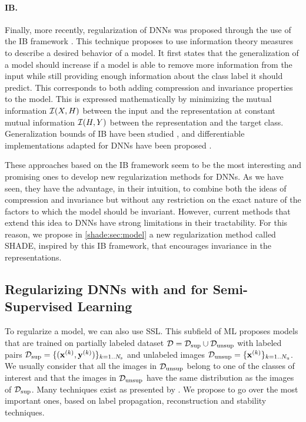 \paragraph{\acf{IB}.} Finally, more recently, regularization of \acp{DNN} was proposed through the use of the \acf{IB} framework \citep{IB}. This technique proposes to use information theory measures to describe a desired behavior of a model. It first states that the generalization of a model should increase if a model is able to remove more information from the input while still providing enough information about the class label it should predict. This corresponds to both adding compression and invariance properties to the model. This is expressed mathematically by minimizing the mutual information $\mathcal{I}(X, H)$ between the input and the representation at constant mutual information $\mathcal{I}(H, Y)$ between the representation and the target class. Generalization bounds of \ac{IB} have been studied \citep{IBbound}, and differentiable implementations adapted for \acp{DNN} have been proposed \citep{Achille2016,IBvariational,Pereyra2017}.

These approaches based on the \acf{IB} framework seem to be the most interesting and promising ones to develop new regularization methods for \acp{DNN}. As we have seen, they have the advantage, in their intuition, to combine both the ideas of compression and invariance but without any restriction on the exact nature of the factors to which the model should be invariant. However, current methods that extend this idea to \acp{DNN} have strong limitations in their tractability. For this reason, we propose in \autoref{shade:sec:model} a new regularization method called \acs{SHADE}, inspired by this \ac{IB} framework, that encourages invariance in the representations.



\subsection{Regularizing DNNs with and for Semi-Supervised Learning}
\label{shade:sec:RW_SSL}

To regularize a model, we can also use \acf{SSL}. This subfield of \acf{ML} proposes models that are trained on partially labeled dataset $\mathcal{D} = \mathcal{D}_\mathrm{sup} \cup \mathcal{D}_\mathrm{unsup}$ with labeled pairs $\mathcal{D}_\mathrm{sup} = \{(\mathbf{x}^{(k)}, \mathbf{y}^{(k)})\}_{k=1..N_\mathrm{s}}$ and unlabeled images $\mathcal{D}_\mathrm{unsup} = \{\mathbf{x}^{(k)}\}_{k=1..N_\mathrm{u}}$. We usually consider that all the images in $\mathcal{D}_\mathrm{unsup}$ belong to one of the classes of interest and that the images in $\mathcal{D}_\mathrm{unsup}$ have the same distribution as the images of $\mathcal{D}_\mathrm{sup}$. Many techniques exist as presented by \citet{Zhu2005}. We propose to go over the most important ones, based on label propagation, reconstruction and stability techniques.


